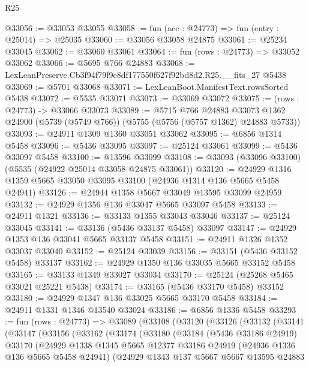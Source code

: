 \begin{lexlean}{R25}
\begin{coremodule}
@33056 := @33053 @33055
@33058 := fun (acc : @24773) => fun (entry : @25014) => @25035
@33060 := @33056 @33058 @24875
@33061 := @25234 @33045
@33062 := @33060 @33061
@33064 := fun (rows : @24773) => @33052 @33062
@33066 := @5695 @766 @24883
@33068 := LexLeanPreserve.Cb3f94f79f9e8df177550f627f92bd8d2.R25.__fits_27 @5438
@33069 := @5701 @33068
@33071 := LexLeanBoot.ManifestText.rowsSorted @5438
@33072 := @5535 @33071
@33073 := @33069 @33072
@33075 := (rows : @24773) -> @33066 @33073
@33089 := @5715
    @766
    @24883
    @33073
    @1362
    @24900
    (@5739 (@5749 @766))
    (@5755 (@5756 (@5757 @1362) @24883 @5733))
@33093 := @24911 @1309 @1360 @33051 @33062
@33095 := @6856 @1314 @5458
@33096 := @5436 @33095
@33097 := @25124 @33061
@33099 := @5436 @33097 @5458
@33100 := @13596 @33099
@33108 := @33093 (@33096 @33100) (@5535 (@24922 @25014 @33058 @24875 @33061))
@33120 := @24929 @1316 @1359 @5665 @33050 @33095 @33100 (@24936 @1314 @136 @5665 @5458 @24941)
@33126 := @24944 @1358 @5667 @33049 @13595 @33099 @24959
@33132 := @24929 @1356 @136 @33047 @5665 @33097 @5458
@33133 := @24911 @1321
@33136 := @33133 @1355 @33043 @33046
@33137 := @25124 @33045
@33141 := @33136 (@5436 @33137 @5458) @33097
@33147 := @24929 @1353 @136 @33041 @5665 @33137 @5458
@33151 := @24911 @1326 @1352 @33037 @33040
@33152 := @25124 @33039
@33156 := @33151 (@5436 @33152 @5458) @33137
@33162 := @24929 @1350 @136 @33035 @5665 @33152 @5458
@33165 := @33133 @1349 @33027 @33034
@33170 := @25124 (@25268 @5465 @33021 @25221 @5438)
@33174 := @33165 (@5436 @33170 @5458) @33152
@33180 := @24929 @1347 @136 @33025 @5665 @33170 @5458
@33184 := @24911 @1331 @1346 @13540 @33024
@33186 := @6856 @1336 @5458
@33293 := fun (rows : @24773) =>
  @33089
    (@33108
      (@33120
        (@33126
          (@33132
            (@33141
              (@33147
                (@33156
                  (@33162
                    (@33174
                      (@33180
                        (@33184
                          (@5436 @33186 @24919)
                          @33170
                          (@24929
                            @1338
                            @1345
                            @5665
                            @12377
                            @33186
                            @24919
                            (@24936 @1336 @136 @5665 @5458 @24941)
                            (@24929
                              @1343
                              @137
                              @5667
                              @5667
                              @13595
                              @24883

\end{coremodule}
\end{lexlean}
